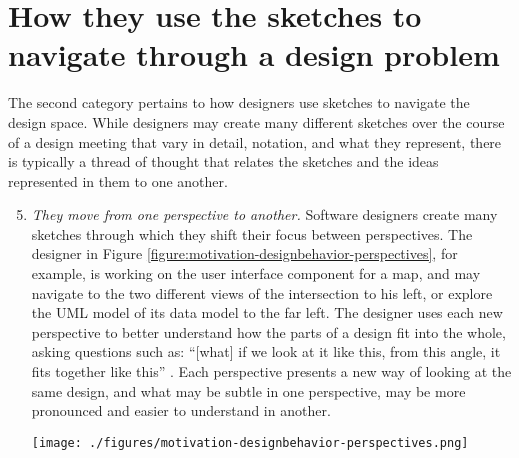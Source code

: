 \documentclass[12pt,fleqn]{ucithesis}
\begin{document}
\section{How they use the sketches to navigate through a design problem}
\label{chapter:motivation:navigation}

The second category pertains to how designers use sketches to navigate the design space. While designers may create many different sketches over the course of a design meeting that vary in detail, notation, and what they represent, there is typically a thread of thought that relates the sketches and the ideas represented in them to one another. 

\begin{enumerate}
  \setcounter{enumi}{4}
  \item \emph{They move from one perspective to another.} Software designers create many sketches through which they shift their focus between perspectives. The designer in Figure \ref{figure:motivation-designbehavior-perspectives}, for example, is working on the user interface component for a map, and may navigate to the two different views of the intersection to his left, or explore the UML model of its data model to the far left. The designer uses each new perspective to better understand how the parts of a design fit into the whole, asking questions such as: ``[what] if we look at it like this, from this angle, it fits together like this'' \cite{petre2009insights}. Each perspective presents a new way of looking at the same design, and what may be subtle in one perspective, may be more pronounced and easier to understand in another. 

  \begin{figure*}[tbh]
  \centering
  \texttt{[image: ./figures/motivation-designbehavior-perspectives.png]}
  \caption{The designer navigates between different types of diagrams and abstractions.}
  \label{figure:motivation-designbehavior-perspectives}
\end{figure*}  


\end{enumerate}
\end{document}
